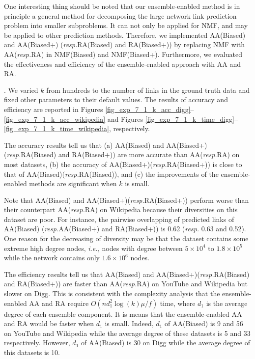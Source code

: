\documentclass[10pt,journal,compsoc]{IEEEtran}
\newcommand{\stitle}[1]{\vspace{0.5ex}\noindent{\bf #1}}
\newcommand{\NMF}{{\sf NMF}\xspace }
\newcommand{\Biased}{{\sf NMF(Biased)}\xspace}
\newcommand{\Aa}{{\sf AA}\xspace }
\newcommand{\RA}{{\sf RA}\xspace }
\newcommand{\Digg}{{\sf Digg}\xspace}
\newcommand{\YouTube}{{\sf YouTube}\xspace}
\newcommand{\Wikipedia}{{\sf Wikipedia}\xspace}
\newcommand{\Biasedp}{{\sf NMF(Biased+)}\xspace}
\newcommand{\AABiased}{{\sf AA(Biased)}\xspace}
\newcommand{\AABiasedp}{{\sf AA(Biased+)}\xspace}
\newcommand{\RABiased}{{\sf RA(Biased)}\xspace}
\newcommand{\RABiasedp}{{\sf RA(Biased+)}\xspace}
\newcommand{\ie}{\emph{i.e.,}\xspace}
\newcommand{\resp}{\emph{resp.}\xspace}
\begin{document}
One interesting thing should be noted that our ensemble-enabled
method is in principle a general method for decomposing the large network
link prediction problem into smaller subproblems. It can not only
be applied for \NMF, and may be applied to other prediction methods.
Therefore, we implemented \AABiased and \AABiasedp
(\resp \RABiased and \RABiasedp) by replacing \NMF with \Aa (\resp \RA) in
\Biased and \Biasedp. Furthermore, we evaluated the effectiveness and efficiency
of the ensemble-enabled approach with \Aa and \RA.


\stitle{Exp-7.1: Impacts of $k$}. We varied $k$ from hundreds to the number of links in the ground truth data
and fixed other parameters to their default values. The results of accuracy
and  efficiency  are reported in Figures \ref{fig_exp_7_1_k_acc_digg}--\ref{fig_exp_7_1_k_acc_wikipedia}
and Figures \ref{fig_exp_7_1_k_time_digg}--\ref{fig_exp_7_1_k_time_wikipedia}, respectively.


The accuracy results tell us that (a) \AABiased and \AABiasedp (\resp \RABiased and \RABiasedp)
are more accurate than \Aa (\resp \RA) on most datasets,
(b) the accuracy of \AABiasedp (\resp \RABiasedp) is close to that of \AABiased (\resp \RABiased),
and (c) the improvements of the ensemble-enabled methods are significant when $k$
is small.

Note that \AABiased and \AABiasedp (\resp \RABiasedp)
perform worse than their counterpart \Aa (\resp \RA) on \Wikipedia because their diversities
on this dataset are poor. For instance, the pairwise overlapping of predicted links of \AABiased
(\resp \AABiasedp and \RABiasedp) is 0.62 (\resp 0.63 and 0.52). One reason for the decreasing
of diversity may be that the dataset contains some extreme high degree nodes,
\ie nodes with degree between $5 \times 10^4$ to $1.8 \times 10^5$ while the network contains
only $1.6 \times 10^6$ nodes.

The  efficiency  results tell us that \AABiased and \AABiasedp (\resp \RABiased and \RABiasedp)
are faster than \Aa (\resp \RA) on \YouTube and \Wikipedia but
slower on \Digg. This is consistent with the complexity analysis
that the ensemble-enabled \Aa and \RA require $O(nd_{1}^{2}\log(k)\mu/f)$ time,
where $d_1$ is the average degree of each ensemble component. It is means
that the ensemble-enabled \Aa and \RA would be faster when $d_1$ is small.
Indeed, $d_1$ of \AABiased is 9 and 56 on \YouTube and \Wikipedia while the average
degree of these datasets is 5 and 33 respectively. However, $d_1$ of \AABiased is 30
on \Digg  while the average degree of this datasets is 10.
\end{document}
